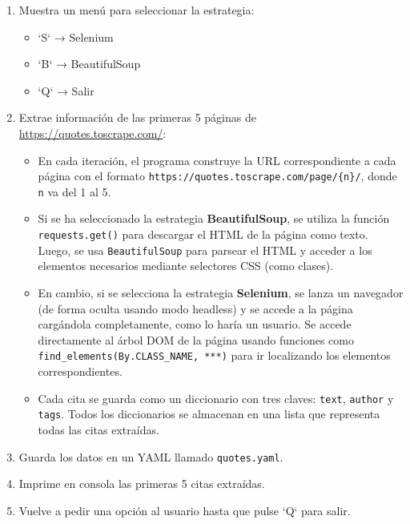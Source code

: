 \documentclass[a4paper,12pt]{article}
\begin{document}
\begin{enumerate}
    \item Muestra un menú para seleccionar la estrategia:
    \begin{itemize}
        \item `S` → Selenium
        \item `B` → BeautifulSoup
        \item `Q` → Salir
    \end{itemize}
    
\item Extrae información de las primeras 5 páginas de \url{https://quotes.toscrape.com/}:

\begin{itemize}
    \item En cada iteración, el programa construye la URL correspondiente a cada página con el formato \texttt{https://quotes.toscrape.com/page/\{n\}/}, donde \texttt{n} va del 1 al 5.
    
    \item Si se ha seleccionado la estrategia \textbf{BeautifulSoup}, se utiliza la función \texttt{requests.get()} para descargar el HTML de la página como texto. Luego, se usa \texttt{BeautifulSoup} para parsear el HTML y acceder a los elementos necesarios mediante selectores CSS (como clases).
    
    \item En cambio, si se selecciona la estrategia \textbf{Selenium}, se lanza un navegador (de forma oculta usando modo headless) y se accede a la página cargándola completamente, como lo haría un usuario. 
    Se accede directamente al árbol DOM de la página usando funciones como \texttt{find\_elements(By.CLASS\_NAME, ***)} para ir localizando los elementos correspondientes. 

    \item Cada cita se guarda como un diccionario con tres claves: \texttt{text}, \texttt{author} y \texttt{tags}. Todos los diccionarios se almacenan en una lista que representa todas las citas extraídas.
\end{itemize}    
    \item Guarda los datos en un YAML llamado \texttt{quotes.yaml}.
    
    \item Imprime en consola las primeras 5 citas extraídas.
    
    \item Vuelve a pedir una opción al usuario hasta que pulse `Q` para salir.
\end{enumerate}
\end{document}
